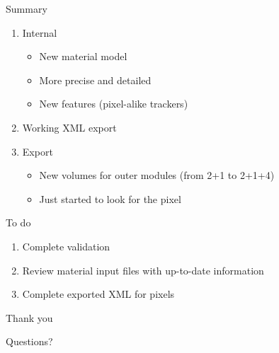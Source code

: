 \documentclass[pdftex, 11pt]{beamer}
\begin{document}
\begin{frame}{Summary}
  \begin{enumerate}
  \item \alert{Internal}
    \begin{itemize}
    \item New material \alert{model}
    \item More \alert{precise} and \alert{detailed}
    \item New \alert{features} (pixel-alike trackers)
    \end{itemize}
  \item Working \alert{XML} export
  \item \alert{Export}
    \begin{itemize}
    \item New \alert{volumes} for outer modules (from 2+1 to 2+1+4)
    \item Just started to look for the \alert{pixel}
    \end{itemize}
  \end{enumerate}
  \begin{block}{To do}
    \begin{enumerate}
    \item Complete \alert{validation}
    \item \alert{Review} material input files with up-to-date information
    \item Complete exported \alert{XML} for pixels
    \end{enumerate}
  \end{block}
\end{frame}

\begin{frame}
  Thank you
  \begin{center}
    \fontsize{16}{11}\selectfont 
    \alert{Questions?}
    \normalsize
  \end{center}
\end{frame}
\end{document}
